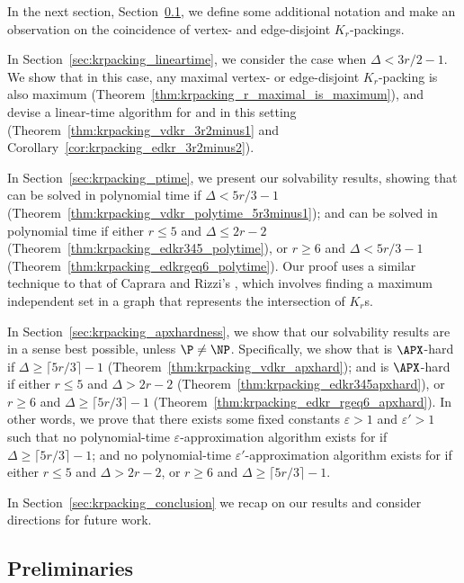 In the next section, Section~\ref{sec:krpacking_prelims}, we define some additional notation and make an observation on the coincidence of vertex- and edge-disjoint $K_r$-packings.

In Section~\ref{sec:krpacking_lineartime}, we consider the case when $\Delta < 3r/2 - 1$. We show that in this case, any maximal vertex- or edge-disjoint $K_r$-packing is also maximum (Theorem~\ref{thm:krpacking_r_maximal_is_maximum}), and devise a linear-time algorithm for \vdkr and \edkr in this setting (Theorem~\ref{thm:krpacking_vdkr_3r2minus1} and Corollary~\ref{cor:krpacking_edkr_3r2minus2}). 

In Section~\ref{sec:krpacking_ptime}, we present our solvability results, showing that \vdkr can be solved in polynomial time if $\Delta < 5r/3 - 1$ (Theorem~\ref{thm:krpacking_vdkr_polytime_5r3minus1}); and \edkr can be solved in polynomial time if either $r\leq 5$ and $\Delta \leq 2r - 2$ (Theorem~\ref{thm:krpacking_edkr345_polytime}), or $r\geq 6$ and $\Delta < 5r/3 - 1$ (Theorem~\ref{thm:krpacking_edkrgeq6_polytime}). Our proof uses a similar technique to that of Caprara and Rizzi's \cite{caprara_packing_2002}, which involves finding a maximum independent set in a graph that represents the intersection of $K_r$s.

In Section~\ref{sec:krpacking_apxhardness}, we show that our solvability results are in a sense best possible, unless $\P \neq \NP$. Specifically, we show that \vdkr is $\APX$-hard if $\Delta \geq \lceil 5r/3 \rceil - 1$ (Theorem~\ref{thm:krpacking_vdkr_apxhard}); and \edkr is $\APX$-hard if either $r \leq 5$ and $\Delta > 2r - 2$ (Theorem~\ref{thm:krpacking_edkr345apxhard}), or $r \geq 6$ and $\Delta \geq \lceil 5r/3 \rceil - 1$ (Theorem~\ref{thm:krpacking_edkr_rgeq6_apxhard}). In other words, we prove that there exists some fixed constants $\varepsilon > 1$ and $\varepsilon' > 1$ such that no polynomial-time $\varepsilon$-approximation algorithm exists for \vdkr if $\Delta \geq \lceil 5r/3 \rceil - 1$; and no polynomial-time $\varepsilon'$-approximation algorithm exists for \edkr if either $r \leq 5$ and $\Delta > 2r - 2$, or $r \geq 6$ and $\Delta \geq \lceil 5r/3 \rceil - 1$. 

In Section~\ref{sec:krpacking_conclusion} we recap on our results and consider directions for future work.

\subsection{Preliminaries}
\label{sec:krpacking_prelims}
